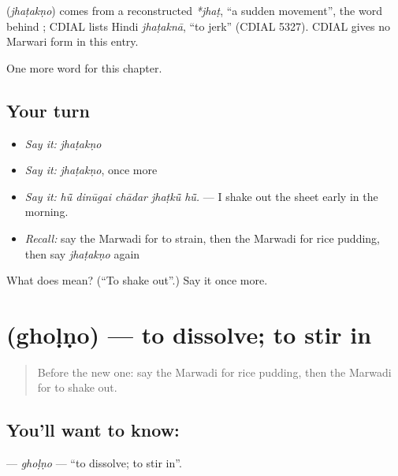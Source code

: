 \begin{cousinweb}
\textbf{} (\emph{jhaṭakṇo}) comes from a reconstructed \emph{*jhaṭ}, \textquotedblleft{}a sudden movement\textquotedblright{}, the word behind \textbf{}; CDIAL lists Hindi \emph{jhaṭaknā}, \textquotedblleft{}to jerk\textquotedblright{} (CDIAL 5327). CDIAL gives no Marwari form in this entry.
\end{cousinweb}

\begin{grammarlens}[title={What you've built}]
One more word for this chapter.
\end{grammarlens}

\subsection*{Your turn}
\begin{itemize}
\raggedright
  \item \emph{Say it:} \emph{jhaṭakṇo}
  \item \emph{Say it:} \emph{jhaṭakṇo}, once more
  \item \emph{Say it:} \emph{hū̃ dinūgai chādar jhaṭkū̃ hū̃.} — I shake out the sheet early in the morning.
  \item \emph{Recall:} say the Marwadi for to strain, then the Marwadi for rice pudding, then say \emph{jhaṭakṇo} again
\end{itemize}

\begin{tcolorbox}[breakable,colback=teal!4,colframe=teal!35!black,title={Before you move on}]
What does  mean? (\textquotedblleft{}To shake out\textquotedblright{}.) Say it once more.
\end{tcolorbox}
\section[\texorpdfstring{\mw{घोळणो} (ghoḷṇo)}{घोळणो (ghoḷṇo)}]{ (ghoḷṇo) — to dissolve; to stir in}

\label{lesson:MW-C182-gholno}



\begin{quote}
Before the new one: say the Marwadi for rice pudding, then the Marwadi for to shake out.
\end{quote}

\subsection*{You'll want to know: }
\textbf{} — \emph{ghoḷṇo} — \textquotedblleft{}to dissolve; to stir in\textquotedblright{}.

